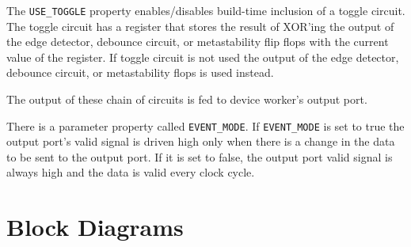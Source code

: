 \begin{flushleft}
The \texttt{USE\_TOGGLE} property enables/disables build-time inclusion of a toggle circuit. The toggle circuit has a register that stores the result of XOR'ing the output of the edge detector, debounce circuit, or metastability flip flops with the current value of the register. If toggle circuit is not used the output of the edge detector, debounce circuit, or metastability flops is used instead.   \newline

The output of these chain of circuits is fed to device worker's output port. \newline

There is a parameter property called \texttt{EVENT\_MODE}. If \texttt{EVENT\_MODE} is set to true the output port's valid signal is driven high only when there is a change in the data to be sent to the output port. If it is set to false, the output port valid signal is always high and the data is valid every clock cycle. 

\end{flushleft}


\section*{Block Diagrams}

